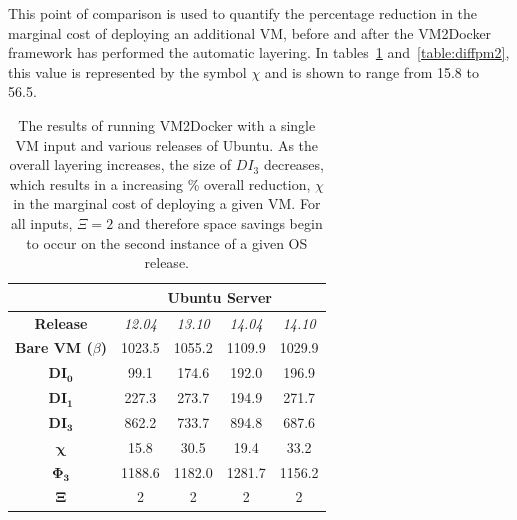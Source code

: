 This point of comparison is used to quantify the percentage reduction in the marginal cost of deploying an additional VM, before and after the VM2Docker framework has performed the automatic layering. In tables~\ref{table:diffpm} and~\ref{table:diffpm2}, this value is represented by the symbol $\chi$ and is shown to range from 15.8 to 56.5.
 
\begin{table}[h]
\centering
    \begin{tabular}{| c | c | c | c | c |}
    \hline
& \multicolumn{4}{|c|}{\bfseries Ubuntu Server} \\ \hline
    \bfseries Release & \itshape 12.04 & \itshape 13.10 & \itshape 14.04 & \itshape 14.10 \\ \hline
    \bfseries Bare VM ($\beta$) & 1023.5  & 1055.2 & 1109.9 & 1029.9\\ \hline
    \bfseries $\boldsymbol{DI_0}$ & 99.1 & 174.6 & 192.0 & 196.9  \\ \hline
    \bfseries $\boldsymbol{DI_1}$ & 227.3 & 273.7 & 194.9 & 271.7  \\ \hline
    \bfseries $\boldsymbol{DI_3}$ & 862.2 & 733.7 & 894.8 & 687.6\\ \hline 
\bfseries $\boldsymbol{\chi}$ & 15.8 & 30.5 & 19.4 & 33.2\\ \hline 
     \bfseries $\boldsymbol{\Phi_3}$ & 1188.6 & 1182.0 & 1281.7 & 1156.2\\ \hline
\bfseries $\boldsymbol{\Xi}$ & 2 & 2 & 2 & 2\\ \hline
    \end{tabular}
\caption{The results of running VM2Docker with a single VM input and various releases of Ubuntu. As the overall layering increases, the size of $DI_3$ decreases, which results in a increasing \% overall reduction, $\chi$ in the marginal cost of deploying a given VM. For all inputs, $\Xi = 2$ and therefore space savings begin to occur on the second instance of a given OS release.}
\label{table:diffpm}
\end{table}

